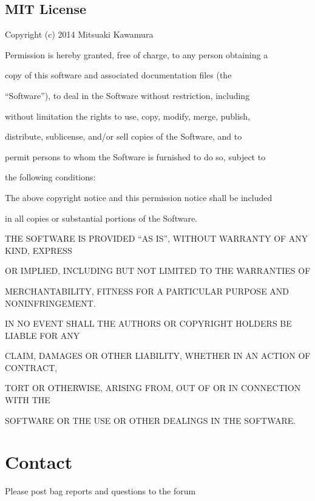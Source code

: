 \documentclass[letterpaper,10pt,pdftex,openany,english]{sphinxmanual}
\begin{document}
\section{MIT License}
\label{\detokenize{copy:mit-license}}\label{\detokenize{copy:mitlicense}}
\begin{DUlineblock}{0em}
\item[] Copyright (c) 2014 Mitsuaki Kawamura
\item[] 
\item[] Permission is hereby granted, free of charge, to any person obtaining a
\item[] copy of this software and associated documentation files (the
\item[] “Software”), to deal in the Software without restriction, including
\item[] without limitation the rights to use, copy, modify, merge, publish,
\item[] distribute, sublicense, and/or sell copies of the Software, and to
\item[] permit persons to whom the Software is furnished to do so, subject to
\item[] the following conditions:
\item[] 
\item[] The above copyright notice and this permission notice shall be included
\item[] in all copies or substantial portions of the Software.
\item[] 
\item[] THE SOFTWARE IS PROVIDED “AS IS”, WITHOUT WARRANTY OF ANY KIND, EXPRESS
\item[] OR IMPLIED, INCLUDING BUT NOT LIMITED TO THE WARRANTIES OF
\item[] MERCHANTABILITY, FITNESS FOR A PARTICULAR PURPOSE AND NONINFRINGEMENT.
\item[] IN NO EVENT SHALL THE AUTHORS OR COPYRIGHT HOLDERS BE LIABLE FOR ANY
\item[] CLAIM, DAMAGES OR OTHER LIABILITY, WHETHER IN AN ACTION OF CONTRACT,
\item[] TORT OR OTHERWISE, ARISING FROM, OUT OF OR IN CONNECTION WITH THE
\item[] SOFTWARE OR THE USE OR OTHER DEALINGS IN THE SOFTWARE.
\end{DUlineblock}

\sphinxstepscope


\chapter{Contact}
\label{\detokenize{contact:contact}}\label{\detokenize{contact::doc}}
\sphinxAtStartPar
Please post bag reports and questions to the forum
\end{document}
